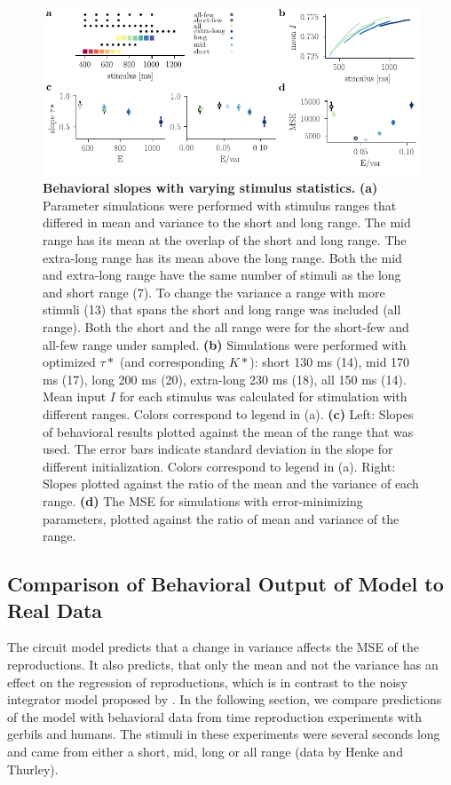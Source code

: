 \documentclass[10pt]{article}
\begin{document}
\begin{figure}[ht]
	\centering
	\includegraphics{figures/ranges_new2.pdf}
	\caption{\textbf{Behavioral slopes with varying stimulus statistics.} 
	\textbf{(a)} Parameter simulations were performed with stimulus ranges that differed in mean and variance to the short and long range. The mid range has its mean at the overlap of the short and long range. The extra-long range has its mean above the long range. Both the mid and extra-long range have the same number of stimuli as the long and short range (7). To change the variance a range with more stimuli (13) that spans the short and long range was included (all range). Both the short and the all range were for the short-few and all-few range under sampled.
	\textbf{(b)} Simulations were performed with optimized $\tau*$ (and corresponding  $K*$): short 130 ms (14), mid 170 ms (17), long 200 ms (20), extra-long 230 ms (18), all 150 ms (14). Mean input $I$ for each stimulus was calculated for stimulation with different ranges. Colors correspond to legend in (a). 
	\textbf{(c)} Left: Slopes of behavioral results plotted against the mean of the range that was used. The error bars indicate standard deviation in the slope for different initialization. Colors correspond to legend in (a).
	Right: Slopes plotted against the ratio of the mean and the variance of each range. 
	\textbf{(d)} The MSE for simulations with error-minimizing parameters, plotted against the ratio of mean and variance of the range.
	}
\label{fig:new_ranges}
\end{figure}

\subsection{Comparison of Behavioral Output of Model to Real Data}
The circuit model predicts that a change in variance affects the MSE of the reproductions.
It also predicts, that only the mean and not the variance has an effect on the regression of reproductions, which is in contrast to the noisy integrator model proposed by \cite{Thurley2016}.
In the following section, we compare predictions of the model with behavioral data from time reproduction experiments with gerbils and humans. The stimuli in these experiments were several seconds long and came from either a short, mid, long or all range (data by Henke and Thurley).
\end{document}
